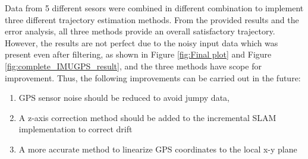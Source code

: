     Data from 5 different sesors were combined in different combination to implement three different trajectory estimation methods. 
    From the provided results and the error analysis, all three methods provide an overall satisfactory trajectory. However, the results are not perfect due to the noisy input data which was present even after filtering, as shown in Figure \ref{fig:Final plot} and Figure \ref{fig:complete_IMUGPS_result}, and the three methods have scope for improvement. Thus, the following improvements can be carried out in the future:

\begin{enumerate}
    \item GPS sensor noise should be reduced to avoid jumpy data, 
    \item A z-axis correction method should be added to the incremental SLAM implementation to correct drift
    \item A more accurate method to linearize GPS coordinates to the local x-y plane
\end{enumerate}
